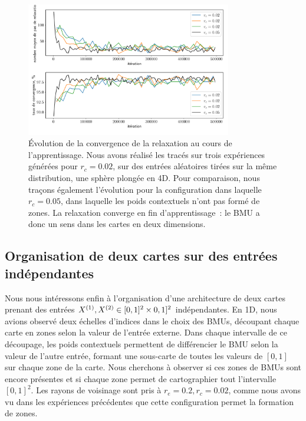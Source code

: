 \documentclass[../main]{subfiles}
\begin{document}
\begin{figure}
	\centering
	\includegraphics[width=0.8\textwidth]{conv_relax_2maps.pdf}
	\vspace{-0.5cm}
	\caption{\'Evolution de la convergence de la relaxation au cours de l'apprentissage. Nous avons réalisé les tracés sur trois expériences générées pour $r_c = 0.02$, sur des entrées aléatoires tirées sur la même distribution, une sphère plongée en 4D. Pour comparaison, nous traçons également l'évolution pour la configuration dans laquelle $r_c = 0.05$, dans laquelle les poids contextuels n'ont pas formé de zones. La relaxation converge en fin d'apprentissage~: le BMU a donc un sens dans les cartes en deux dimensions. \label{fig:relax2D}}
\end{figure}

\subsection{Organisation de deux cartes sur des entrées indépendantes \label{par:cub2D}}

Nous nous intéressons enfin à l'organisation d'une architecture de deux cartes prenant des entrées $X^{({1})}, X^{({2})} \in [0,1]^2 \times 0,1]^2$ indépendantes.
En 1D, nous avions observé deux échelles d'indices dans le choix des BMUs, découpant chaque carte en zones selon la valeur de l'entrée externe. Dans chaque intervalle de ce découpage, les poids contextuels permettent de différencier le BMU selon la valeur de l'autre entrée, formant une sous-carte de toutes les valeurs de $[0,1]$ sur chaque zone de la carte.
Nous cherchons à observer si ces zones de BMUs sont encore présentes et si chaque zone permet de cartographier tout l'intervalle $[0,1]^2$.
Les rayons de voisinage sont pris à $r_e = 0.2, r_c = 0.02$, comme nous avons vu dans les expériences précédentes que cette configuration permet la formation de zones.
\end{document}
